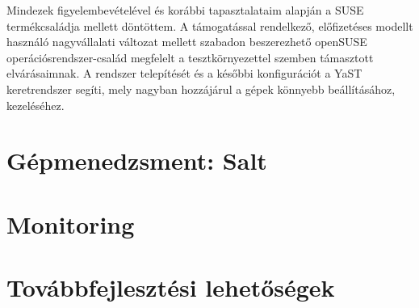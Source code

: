 Mindezek figyelembevételével és korábbi tapasztalataim alapján a SUSE termékcsaládja mellett döntöttem. A támogatással rendelkező, előfizetéses modellt használó nagyvállalati változat mellett szabadon beszerezhető openSUSE operációsrendszer-család megfelelt a tesztkörnyezettel szemben támasztott elvárásaimnak. A rendszer telepítését és a későbbi konfigurációt a YaST keretrendszer segíti, mely nagyban hozzájárul a gépek könnyebb beállításához, kezeléséhez.


\section{Gépmenedzsment: Salt}


\section{Monitoring}

\section{Továbbfejlesztési lehetőségek}